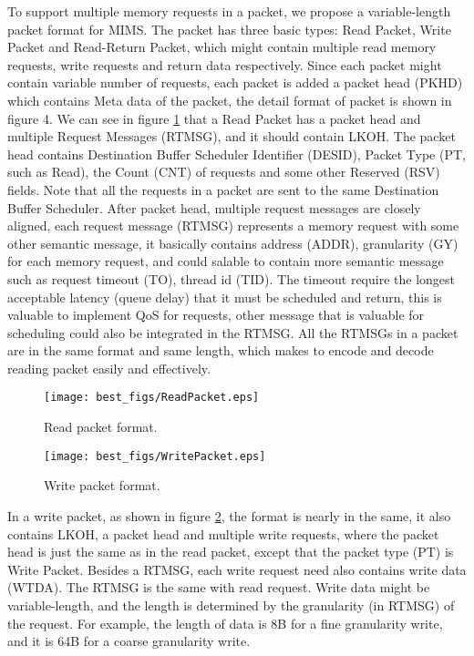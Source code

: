 \documentclass[pageno]{jpaper}
\begin{document}
To support multiple memory requests in a packet, we propose a variable-length packet format for MIMS. The packet has three basic types: Read Packet, Write Packet and Read-Return Packet, which might contain multiple read memory requests, write requests and return data respectively. Since each packet might contain variable number of requests, each packet is added a packet head (PKHD) which contains Meta data of the packet, the detail format of packet is shown in figure 4. We can see in figure \ref{ReadPacket} that a Read Packet has a packet head and multiple Request Messages (RTMSG), and it should contain LKOH. The packet head contains Destination Buffer Scheduler Identifier (DESID), Packet Type (PT, such as Read), the Count (CNT) of requests and some other Reserved (RSV) fields. Note that all the requests in a packet are sent to the same Destination Buffer Scheduler. After packet head, multiple request messages are closely aligned, each request message (RTMSG) represents a memory request with some other semantic message, it basically contains address (ADDR), granularity (GY) for each memory request, and could salable to contain more semantic message such as request timeout (TO), thread id (TID). The timeout require the longest acceptable latency (queue delay) that it must be scheduled and return, this is valuable to implement QoS for requests, other message that is valuable for scheduling could also be integrated in the RTMSG. All the RTMSGs in a packet are in the same format and same length, which makes to encode and decode reading packet  easily and effectively.

\begin{figure}
  \centering
  \texttt{[image: best\_figs/ReadPacket.eps]}
  \caption{Read packet format.}
  \label{ReadPacket}
\end{figure}

\begin{figure}
  \centering
  \texttt{[image: best\_figs/WritePacket.eps]}
  \caption{Write packet format.}
  \label{WritePacket}
\end{figure}

In a write packet, as shown in figure \ref{WritePacket}, the format is nearly in the same, it also contains LKOH, a packet head and multiple write requests, where the packet head is just the same as in the read packet, except that the packet type (PT) is Write Packet. Besides a RTMSG, each write request need also contains write data (WTDA). The RTMSG is the same with read request. Write data might be variable-length, and the length is determined by the granularity (in RTMSG) of the request. For example, the length of data is 8B for a fine granularity write, and it is 64B for a coarse granularity write.
\end{document}
